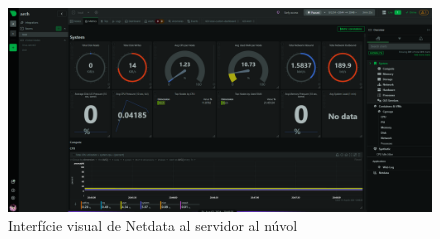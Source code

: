 \begin{figure}[!htbp] \includegraphics[width=1\textwidth]{Imatges/l-netdata.png}
\caption{Interfície visual de Netdata al servidor al núvol} \end{figure}


